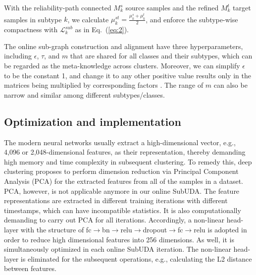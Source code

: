 With the reliability-path connected $M_k^s$ source samples and the refined $M_k^t$ target samples in subtype $k$, we calculate $\mu_k^{st}=\frac{\mu_k^s+\mu_k^t}{2}$, and enforce the subtype-wise compactness with $\mathcal{L}_k^{sub}$ as in Eq.~(\ref{eq:2}). 

The online sub-graph construction and alignment have three hyperparameters, including $\epsilon$, $\tau$, and $m$ that are shared for all classes and their subtypes, which can be regarded as the meta-knowledge across clusters. Moreover, we can simplify $\epsilon$ to be the constant 1, and change it to any other positive value results only in the matrices being multiplied by corresponding factors \cite{liu2017adaptive}. The range of $m$ can also be narrow and similar among different subtypes/classes.







\subsection{Optimization and implementation} 

The modern neural networks usually extract a high-dimensional vector, e.g., 4,096 or 2,048-dimensional features, as their representation, thereby demanding high memory and time complexity in subsequent clustering. To remedy this, deep clustering \cite{caron2018deep} proposes to perform dimension reduction via Principal Component Analysis (PCA) for the extracted features from all of the samples in a dataset. PCA, however, is not applicable anymore in our online SubUDA. The feature representations are extracted in different training iterations with different timestamps, which can have incompatible statistics. It is also computationally demanding to carry out PCA for all iterations. Accordingly, a non-linear head-layer with the structure of {fc$\rightarrow$bn$\rightarrow$relu$\rightarrow$dropout$\rightarrow$fc$\rightarrow$relu} is adopted in order to reduce high dimensional features into 256 dimensions. As well, it is simultaneously optimized in each online SubUDA iteration. The non-linear head-layer is eliminated for the subsequent operations, e.g., calculating the L2 distance between features.

